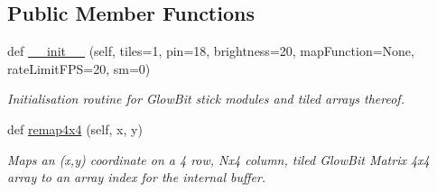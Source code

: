 \subsection*{Public Member Functions}
\begin{DoxyCompactItemize}
\item 
def \hyperlink{classglowbit_1_1matrix4x4_ac2df92961032072572d1e4e8b98ede14}{\+\_\+\+\_\+init\+\_\+\+\_\+} (self, tiles=1, pin=18, brightness=20, map\+Function=None, rate\+Limit\+F\+PS=20, sm=0)
\begin{DoxyCompactList}\small\item\em Initialisation routine for Glow\+Bit stick modules and tiled arrays thereof. \end{DoxyCompactList}\item 
def \hyperlink{classglowbit_1_1matrix4x4_aea814e3be265990137d4027ae181e58d}{remap4x4} (self, x, y)
\begin{DoxyCompactList}\small\item\em Maps an (x,y) coordinate on a 4 row, Nx4 column, tiled Glow\+Bit Matrix 4x4 array to an array index for the internal buffer. \end{DoxyCompactList}\end{DoxyCompactItemize}
